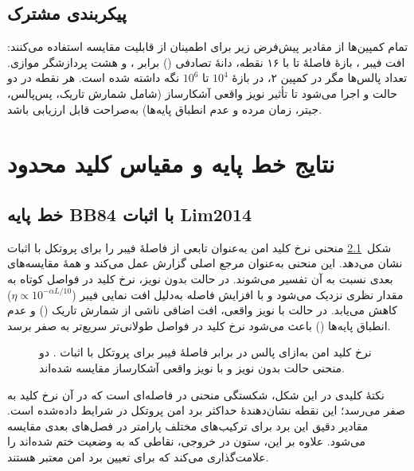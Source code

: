 \section{پیکربندی مشترک}
تمام کمپین‌ها از مقادیر پیش‌فرض زیر برای اطمینان از قابلیت مقایسه استفاده می‌کنند: افت فیبر ، بازهٔ فاصلهٔ  تا  با ۱۶ نقطه، دانهٔ تصادفی () برابر ، و هشت پردازشگر موازی. تعداد پالس‌ها مگر در کمپین ۲، در بازهٔ $10^4$ تا $10^6$ نگه داشته شده است. هر نقطه در دو حالت  و  اجرا می‌شود تا تأثیر نویز واقعی آشکارساز (شامل شمارش تاریک، پس‌پالس، جیتر، زمان مرده و عدم انطباق پایه‌ها) به‌صراحت قابل ارزیابی باشد.

\chapter{نتایج خط پایه و مقیاس کلید محدود}
\label{ch:results_baseline}

\section{خط پایه BB84 با اثبات Lim2014}
شکل~\ref{fig:01_baseline} منحنی نرخ کلید امن به‌عنوان تابعی از فاصلهٔ فیبر را برای پروتکل  با اثبات  نشان می‌دهد. این منحنی به‌عنوان مرجع اصلی گزارش عمل می‌کند و همهٔ مقایسه‌های بعدی نسبت به آن تفسیر می‌شوند. در حالت بدون نویز، نرخ کلید در فواصل کوتاه به مقدار نظری نزدیک می‌شود و با افزایش فاصله به‌دلیل افت نمایی فیبر ($\eta \propto 10^{-\alpha L/10}$) کاهش می‌یابد. در حالت با نویز واقعی، افت اضافی ناشی از شمارش تاریک () و عدم انطباق پایه‌ها () باعث می‌شود نرخ کلید در فواصل طولانی‌تر سریع‌تر به صفر برسد.

\begin{figure}[htbp]
\centering
{}
\caption{نرخ کلید امن به‌ازای پالس در برابر فاصلهٔ فیبر برای پروتکل  با اثبات . دو منحنی حالت بدون نویز و با نویز واقعی آشکارساز مقایسه شده‌اند.}
\label{fig:01_baseline}
\end{figure}

نکتهٔ کلیدی در این شکل، شکستگی منحنی در فاصله‌ای است که در آن نرخ کلید به صفر می‌رسد؛ این نقطه نشان‌دهندهٔ حداکثر برد امن پروتکل در شرایط داده‌شده است. مقادیر دقیق این برد برای ترکیب‌های مختلف پارامتر در فصل‌های بعدی مقایسه می‌شود. علاوه بر این، ستون  در  خروجی، نقاطی که به وضعیت  ختم شده‌اند را علامت‌گذاری می‌کند که برای تعیین برد امن معتبر هستند.

